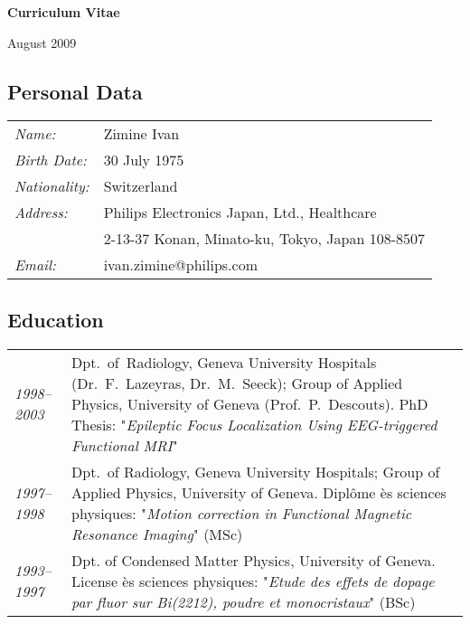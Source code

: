 \documentclass[a4paper,11pt,oneside]{article}
\begin{document}
\pagestyle{empty}

\begin{center}
{\large \textbf{Curriculum Vitae}}\\

\vspace{2mm}

August 2009

\end{center}


\subsection*{Personal Data}
\begin{tabular}{>{\itshape}p{3cm} p{12cm}}
Name:        & Zimine Ivan \\
Birth Date:  & 30 July 1975 \\
Nationality: & Switzerland \\
Address:     & Philips Electronics Japan, Ltd., Healthcare\\
             & 2-13-37 Konan, Minato-ku, Tokyo, Japan 108-8507\\
Email:       & ivan.zimine@philips.com \\
\end{tabular}

\vspace{5mm}

\subsection*{Education}
\begin{tabular}{>{\itshape}p{3cm} p{12cm}}

1998--2003 & Dpt.~of~Radiology, Geneva University Hospitals
             (Dr.~F.~Lazeyras, Dr.~M.~Seeck); 
             Group of Applied Physics, University of Geneva
             (Prof.~P.~Descouts).
             PhD Thesis: "\textit{Epileptic Focus Localization
             Using EEG-triggered Functional MRI}"\\

1997--1998 & Dpt.\ of Radiology, Geneva University Hospitals; 
              Group of Applied Physics, University of Geneva.
              Dipl\^{o}me \`{e}s sciences physiques: 
              "\textit{\mbox{Motion} correction in Functional 
              Magnetic Resonance Imaging}" 
              (MSc)\\

1993--1997 & Dpt. of Condensed Matter Physics, University of Geneva. 
              License \`{e}s sciences physiques: "\textit{Etude des effets
              de dopage par fluor sur Bi(2212), poudre et monocristaux}"
              (BSc)\\

\end{tabular}
\end{document}
